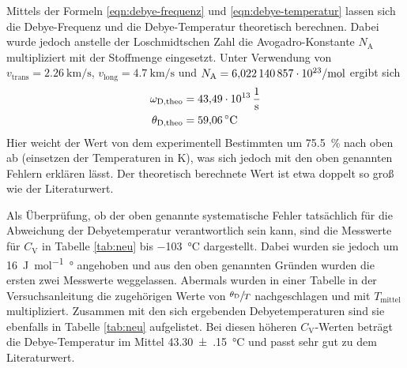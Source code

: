 Mittels der Formeln
\eqref{eqn:debye-frequenz} und \eqref{eqn:debye-temperatur}
lassen sich die Debye-Frequenz und die Debye-Temperatur theoretisch
berechnen. Dabei wurde jedoch anstelle der Loschmidtschen Zahl die
Avogadro-Konstante $N_\text{A}$ multipliziert mit der Stoffmenge eingesetzt.
Unter Verwendung von
$v_\text{trans}=\SI{2.26}{\kilo\meter\per\second}$,
$v_\text{long}=\SI{4.7}{\kilo\meter\per\second}$ \cite[p.~5]{anleitung}
und $N_\text{A}=\SI{6.022140857e+23}{\raiseto{-1}\mole}$ \cite{scipy}
ergibt sich
\begin{align*}
    \omega_\text{D,theo} &= \SI{43.49e13}{\raiseto{-1}\second} \\
    \theta_\text{D,theo} &= \SI{59.06}{\celsius}
\end{align*}
Hier weicht der Wert von dem experimentell Bestimmten um \SI{75.5}{\percent}
nach oben ab (einsetzen der Temperaturen in \si{\kelvin}),
was sich jedoch mit den oben genannten Fehlern erklären lässt.
Der theoretisch berechnete Wert ist etwa doppelt so groß wie der Literaturwert.

Als Überprüfung, ob der oben genannte systematische Fehler tatsächlich für
die Abweichung der Debyetemperatur verantwortlich sein kann, sind die
Messwerte für $C_\text{V}$ in Tabelle \ref{tab:neu} bis \SI{-103}{\celsius}
dargestellt. Dabei wurden sie jedoch um \SI{16}{\joule\per\mole\degree}
angehoben und aus den oben genannten Gründen wurden die ersten zwei Messwerte
weggelassen. Abermals wurden in einer Tabelle in der Versuchsanleitung
\cite[p.~5]{anleitung} die zugehörigen Werte von $\sfrac{\theta_\text{D}}{T}$
nachgeschlagen und mit $T_\text{mittel}$ multipliziert. Zusammen mit den
sich ergebenden Debyetemperaturen sind sie ebenfalls in Tabelle \ref{tab:neu}
aufgelistet. Bei diesen höheren $C_\text{V}$-Werten beträgt die
Debye-Temperatur im Mittel \SI{43.30(15)}{\celsius} und passt sehr gut zu
dem Literaturwert.


